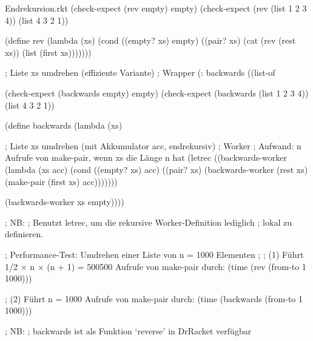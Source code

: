 \begin{filecontents*}{Endrekursion.rkt}
(check-expect (rev empty) empty)
(check-expect (rev (list 1 2 3 4)) (list 4 3 2 1))

(define rev
  (lambda (xs)
    (cond ((empty? xs) empty)
          ((pair? xs) 
           (cat (rev (rest xs)) (list (first xs)))))))


; Liste xs umdrehen (effiziente Variante)
; Wrapper
(: backwards ((list-of %

(check-expect (backwards empty) empty)
(check-expect (backwards (list 1 2 3 4)) (list 4 3 2 1))

(define backwards
  (lambda (xs)
    
    ; Liste xs umdrehen (mit Akkumulator acc, endrekursiv)
    ; Worker
    ; Aufwand: n Aufrufe von make-pair, wenn xs die Länge n hat
    (letrec ((backwards-worker
              (lambda (xs acc)
                (cond ((empty? xs) acc)
                      ((pair? xs) 
                       (backwards-worker (rest xs) (make-pair (first xs) acc)))))))
      
      (backwards-worker xs empty))))

; NB:
; Benutzt letrec, um die rekursive Worker-Definition lediglich
; lokal zu definieren.


; Performance-Test: Umdrehen einer Liste von n = 1000 Elementen
;
; (1) Führt 1/2 × n × (n + 1) = 500500 Aufrufe von make-pair durch:
(time (rev (from-to 1 1000)))

; (2) Führt n = 1000 Aufrufe von make-pair durch:
(time (backwards (from-to 1 1000)))


; NB:
; backwards ist als Funktion `reverse' in DrRacket verfügbar
\end{filecontents*}
